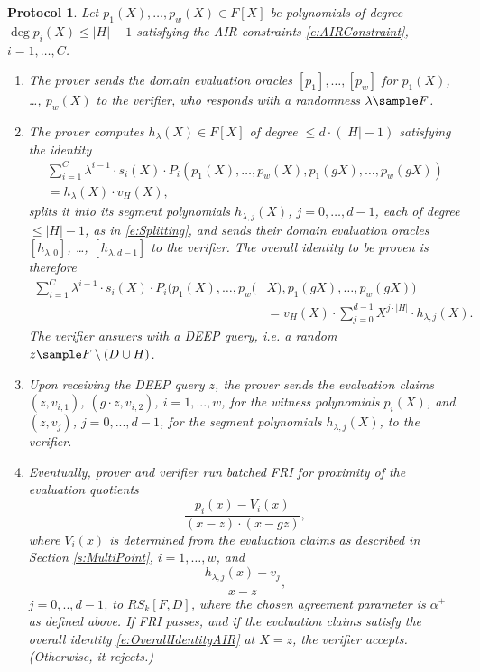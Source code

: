 \documentclass[11pt,article,oneside]{memoir}
\newtheorem{protocol}[]{Protocol}
\theoremstyle{definition}
\theoremstyle{remark}
\DeclareMathOperator{\Quotient}{\mathsf{Quotient}}
\begin{document}
\begin{protocol}
Let $p_1(X), \ldots, p_w(X)\in F[X]$ be polynomials of degree $\deg p_i(X)\leq |H|-1$ satisfying the AIR constraints \eqref{e:AIRConstraint}, $i=1,\ldots, C$.
\begin{enumerate}
\item
The prover sends the domain evaluation oracles  $[p_1], \ldots, [p_w]$ for $p_1(X)$, \ldots, $p_w(X)$ to the verifier, who responds with a randomness $\lambda\sample F$.
%
\item 
The prover computes $h_\lambda(X)\in F[X]$ of degree $\leq d \cdot (|H|-1)$ satisfying the identity
\begin{multline*}
\sum_{i=1}^{C} \lambda^{i-1}\cdot s_i(X)\cdot P_i(p_1(X),\ldots ,p_w(X),p_1(gX), \ldots, p_w(gX)) 
\\ 
= h_\lambda(X)\cdot v_H(X),
\end{multline*}
splits it into its segment polynomials $h_{\lambda, j}(X)$, $j=0,\ldots, d-1$, each of degree $\leq |H|-1$, as in \eqref{e:Splitting}, and sends their domain evaluation oracles $[h_{\lambda,0}]$, \ldots, $[h_{\lambda,d - 1}]$ to the verifier.  
The overall identity to be proven is therefore
\begin{equation}
\label{e:OverallIdentityAIR}
\begin{aligned}
\sum_{i=1}^{C} \lambda^{i-1}\cdot s_i(X)\cdot P_i(p_1(X), \ldots, p_w(&X), p_1(gX), \ldots, p_w(gX))
\\ 
&= v_H(X)\cdot \sum_{j=0}^{d-1} X^{j\cdot |H|}\cdot  h_{\lambda,j}(X).
\end{aligned}
\end{equation}
The verifier answers with a DEEP query, i.e. a random $z\sample F\setminus (D\cup H)$.
%
\item 
Upon receiving the DEEP query $z$, the prover sends the evaluation claims $(z,v_{i,1})$, $(g\cdot z, v_{i,2})$, $i=1,...,w$, for the witness polynomials $p_i(X)$, and $(z,v_j)$, $j=0,...,d-1$, for the segment polynomials $h_{\lambda, j}(X)$, to the verifier.
\item
Eventually, prover and verifier run batched FRI for proximity of the evaluation quotients
\begin{equation*}
\frac{p_ i(x)- V_i(x)}{(x-z)\cdot (x-gz)},
\end{equation*}
where $V_i(x)$ is determined from the evaluation claims as described in Section \ref{s:MultiPoint},
 $i=1,\ldots,w$, and
\begin{equation*}
\frac{h_{\lambda,j}(x)-v_j}{x-z}, 
\end{equation*}
$j=0,..,d-1$, to $RS_k[F,D]$, where the chosen agreement parameter is $\alpha^+$ as defined above. 
If FRI passes, and if the evaluation claims satisfy the overall identity \eqref{e:OverallIdentityAIR} at $X=z$, the verifier accepts. 
(Otherwise, it rejects.)
\end{enumerate}
\end{protocol}
\end{document}
